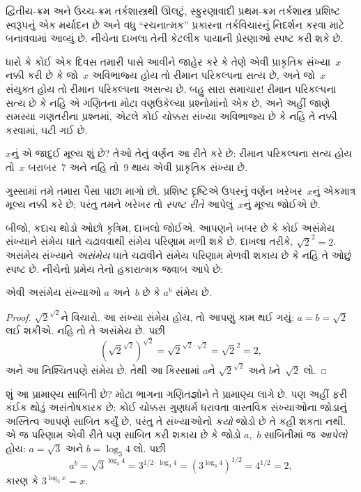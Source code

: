 \documentclass[../../../include/open-logic-section]{subfiles}
\begin{document}


દ્વિતીય-ક્રમ અને ઉચ્ચ-ક્રમ તર્કશાસ્ત્રથી ઊલટું, સ્ફુરણાવાદી
પ્રથમ-ક્રમ તર્કશાસ્ત્ર પ્રશિષ્ટ સ્વરૂપનું એક મર્યાદન છે અને વધુ
``રચનાત્મક'' પ્રકારના તર્કવિચારનું નિદર્શન કરવા માટે બનાવવામાં આવ્યું
છે. નીચેના દાખલા તેની કેટલીક પાયાની પ્રેરણાઓ સ્પષ્ટ કરી શકે છે.

ધારો કે કોઈ એક દિવસ તમારી પાસે આવીને જાહેર કરે કે તેણે એવી પ્રાકૃતિક
સંખ્યા~$x$ નક્કી કરી છે કે જો~$x$ અવિભાજ્ય હોય તો રીમાન પરિકલ્પના સત્ય
છે, અને જો~$x$ સંયુક્ત હોય તો રીમાન પરિકલ્પના અસત્ય છે. બહુ સારા
સમાચાર!{} રીમાન પરિકલ્પના સત્ય છે કે નહિ એ ગણિતના મોટા વણઉકેલ્યા
પ્રશ્નોમાંનો એક છે, અને અહીં જાણે સમસ્યા ગણતરીના પ્રશ્નમાં, એટલે કોઈ
ચોક્કસ સંખ્યા અવિભાજ્ય છે કે નહિ તે નક્કી કરવામાં, ઘટી ગઈ છે.

$x$નું એ જાદુઈ મૂલ્ય શું છે? તેઓ તેનું વર્ણન આ રીતે કરે છે: રીમાન
પરિકલ્પના સત્ય હોય તો~$x$ બરાબર~$7$ અને નહિ તો~$9$ થાય એવી પ્રાકૃતિક
સંખ્યા છે.

ગુસ્સામાં તમે તમારા પૈસા પાછા માગો છો. પ્રશિષ્ટ દૃષ્ટિએ ઉપરનું વર્ણન
ખરેખર~$x$નું એકમાત્ર મૂલ્ય નક્કી કરે છે; પરંતુ તમને ખરેખર તો
\emph{સ્પષ્ટ રીતે} આપેલું~$x$નું મૂલ્ય જોઈએ છે.

બીજો, કદાચ થોડો ઓછો કૃત્રિમ, દાખલો જોઈએ. આપણને ખબર છે કે કોઈ અસંમેય
સંખ્યાને સંમેય ઘાતે ચઢાવવાથી સંમેય પરિણામ મળી શકે છે. દાખલા તરીકે,
$\sqrt{2}^2 = 2$. અસંમેય સંખ્યાને \emph{અસંમેય} ઘાતે ચઢાવીને સંમેય
પરિણામ મેળવી શકાય છે કે નહિ તે ઓછું સ્પષ્ટ છે. નીચેનો પ્રમેય તેનો
હકારાત્મક જવાબ આપે છે:

\begin{thm}
એવી અસંમેય સંખ્યાઓ $a$ અને~$b$ છે કે $a^b$ સંમેય છે.
\end{thm}

\begin{proof}
$\sqrt{2}^{\sqrt{2}}$ને વિચારો. આ સંખ્યા સંમેય હોય, તો આપણું કામ થઈ
ગયું: $a = b = \sqrt{2}$ લઈ શકીએ. નહિ તો તે અસંમેય છે. પછી
\[
(\sqrt{2}^{\sqrt{2}})^{\sqrt{2}} = \sqrt{2}^{\sqrt{2} \cdot
  \sqrt{2}} = \sqrt{2}^2 = 2,
\]
અને આ નિશ્ચિતપણે સંમેય છે. તેથી આ કિસ્સામાં $a$ને
$\sqrt{2}^{\sqrt{2}}$ અને $b$ને~$\sqrt 2$ લો.
\end{proof}

શું આ પ્રામાણ્ય સાબિતી છે? મોટા ભાગના ગણિતજ્ઞોને તે પ્રામાણ્ય લાગે છે.
પણ અહીં ફરી કંઈક થોડું અસંતોષકારક છે: કોઈ ચોક્કસ ગુણધર્મ ધરાવતા
વાસ્તવિક સંખ્યાઓના જોડાનું અસ્તિત્વ આપણે સાબિત કર્યું છે, પરંતુ તે
સંખ્યાઓનો \emph{કયો} જોડો છે તે કહી શકતા નથી. એ જ પરિણામ એવી રીતે પણ
સાબિત કરી શકાય છે કે જોડો $a$,~$b$ સાબિતીમાં જ \emph{આપેલો} હોય:
$a = \sqrt{3}$ અને $b = \log_3 4$ લો. પછી
\[
a^b = \sqrt{3}^{\log_3 4} = 3^{1/2 \cdot \log_3 4} = (3^{\log_3
  4})^{1/2} = 4^{1/2}= 2,
\]
કારણ કે $3^{\log_3 x} = x$.
\end{document}
